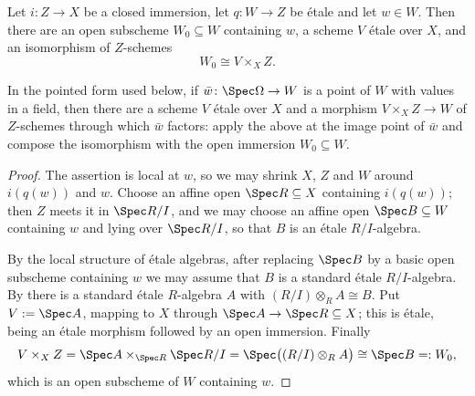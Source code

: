 \begin{lemma}
\label{lemma:openclosed-etale-lifts-locally}
\leanok
Let $i\colon Z\to X$ be a closed immersion, let $q\colon W\to Z$ be \'etale
and let $w\in W$.  Then there are an open subscheme $W_0\subseteq W$
containing $w$, a scheme $V$ \'etale over $X$, and an isomorphism of
$Z$-schemes
\[
  W_0\cong V\times_XZ.
\]

In the pointed form used below, if $\bar w\colon\Spec\Omega\to W$ is a point
of $W$ with values in a field, then there are a scheme $V$ \'etale over $X$
and a morphism $V\times_XZ\to W$ of $Z$-schemes through which $\bar w$
factors: apply the above at the image point of $\bar w$ and compose the
isomorphism with the open immersion $W_0\subseteq W$.
\end{lemma}
\begin{proof}
\leanok
The assertion is local at $w$, so we may shrink $X$, $Z$ and $W$ around
$i(q(w))$ and $w$.  Choose an affine open $\Spec R\subseteq X$ containing
$i(q(w))$; then $Z$ meets it in $\Spec R/I$, and we may choose an affine open
$\Spec B\subseteq W$ containing $w$ and lying over $\Spec R/I$, so that $B$
is an \'etale $R/I$-algebra.

By the local structure of \'etale algebras, after replacing $\Spec B$ by a
basic open subscheme containing $w$ we may assume that $B$ is a standard
\'etale $R/I$-algebra.  By
 there is a standard \'etale
$R$-algebra $A$ with $(R/I)\otimes_RA\cong B$.  Put
$V:=\Spec A$, mapping to $X$ through $\Spec A\to\Spec R\subseteq X$; this is
\'etale, being an \'etale morphism followed by an open immersion.  Finally
\[
  V\times_XZ=\Spec A\times_{\Spec R}\Spec R/I=\Spec\bigl((R/I)\otimes_RA\bigr)
  \cong\Spec B=:W_0,
\]
which is an open subscheme of $W$ containing $w$.
\end{proof}

